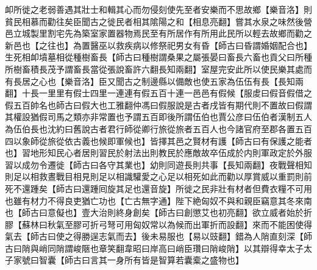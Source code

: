 卹所徙之老弱善遇其壯士和輯其心而勿侵刻使先至者安樂而不思故鄉【樂音洛】則貧民相慕而勸往矣臣聞古之徙民者相其隂陽之和【相息亮翻】嘗其水泉之味然後營邑立城製里割宅先為築室家置器物焉民至有所居作有所用此民所以輕去故鄉而勸之新邑也【之往也】為置醫巫以救疾病以修祭祀男女有昏【師古曰昏謂婚姻配合也】生死相卹墳墓相從種樹畜長【師古曰種樹謂桑果之屬張晏曰畜長六畜也貢父曰所種所樹畜積長茂予謂畜長當從張說畜許六翻長知兩翻】室屋完安此所以使民樂其處而有長居之心也【樂音洛】臣又聞古之制邊縣以備敵也使五家為伍伍有長【長知兩翻】十長一里里有假士四里一連連有假五百十連一邑邑有假候【服䖍曰假音假借之假五百帥名也師古曰假大也工雅翻仲馮曰假服說是古者戌皆有期代則不置故曰假謂其權設猶假司馬之類亦非常置也予謂五百即後所謂伍伯也賈公彦曰伍伯者漢制五人為伍伯長也沈約曰舊說古者君行師從卿行旅從旅者五百人也今諸官府至郡各置五百四以象師從旅從依古義也候即軍候也】皆擇其邑之賢材有護【師古曰有保護之能者也】習地形知民心者居則習民於射法出則教民於應敵故卒伍成於内則軍政定於外服習以成勿令遷徙【師古曰各守其業也】幼則同遊長則共事【長知兩翻】夜戰聲相知則足以相救晝戰目相見則足以相識驩愛之心足以相死如此而勸以厚賞威以重罰則前死不還踵矣【師古曰還踵囘旋其足也還音旋】所徙之民非壯有材者但費衣糧不可用也雖有材力不得良吏猶亡功也【亡古無字通】陛下絶匈奴不與和親臣竊意其冬來南也【師古曰意儗也】壹大治則終身創矣【師古曰創懲艾也初亮翻】欲立威者始於折膠【蘇林曰秋氣至膠可折弓弩可用匈奴常以為候而出軍折而設翻】來而不能困使得氣去【師古曰使之得勝逞志氣而去】後未易服也【易以豉翻】錯為人陗直刻深【師古曰陗與峭同陗謂峻陿也章笑翻韋昭曰岸高曰峭臣瓚曰陗峻陗】以其辯得幸太子太子家號曰智囊【師古曰言其一身所有皆是智算若囊槖之盛物也】

